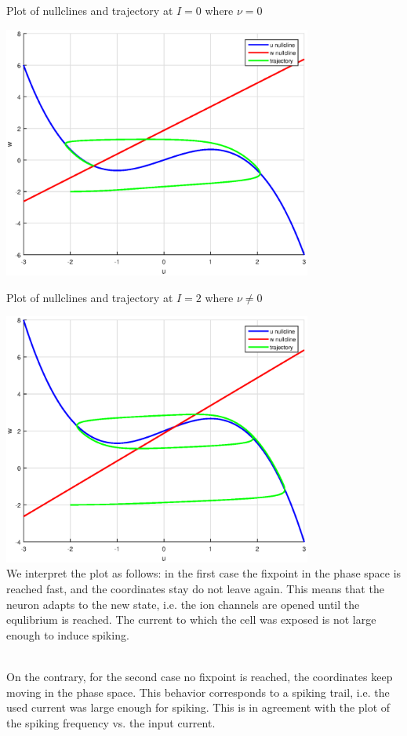 \documentclass[12pt]{article}
\newenvironment{exercise}[2][Exercise]{\begin{trivlist}
\item[\hskip \labelsep {\bfseries #1}\hskip \labelsep {\bfseries #2.}]}{\end{trivlist}}
\newcommand{\added}[1]{
		{#1}
}
\newcommand{\addedfragile}[1]{{\color{green!50!black}{#1}}{}}
\begin{document}
\begin{exercise}{3.3}
\begin{enumerate}
Plot of nullclines and trajectory at $I=0$ where $\nu=0$

	\includegraphics[width=4.0in]{excercise33c_I0.eps}

Plot of nullclines and trajectory at $I=2$ where $\nu\neq0$

	\includegraphics[width=4.0in]{excercise33c_I2.eps}
	\\\added{We interpret the plot as follows: in the first case the fixpoint in the phase space is reached fast, and the coordinates stay do not leave again. This means that the neuron adapts to the new state, i.e. the ion channels are opened until the equlibrium is reached. The current to which the cell was exposed is not large enough to induce spiking.}
	\\\added{On the contrary, for the second case no fixpoint is reached, the coordinates keep moving in the phase space. This behavior corresponds to a spiking trail, i.e. the used current was large enough for spiking. This is in agreement with the plot of the spiking frequency vs. the input current.}
\end{enumerate}

\end{exercise}
\end{document}
